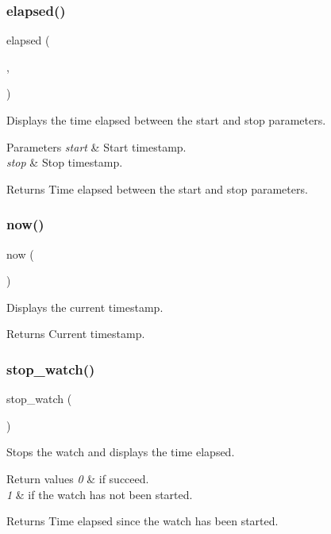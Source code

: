 \subsubsection{\texorpdfstring{elapsed()}{elapsed()}}
{\footnotesize\ttfamily elapsed (\begin{DoxyParamCaption}\item[{start}]{,  }\item[{stop}]{ }\end{DoxyParamCaption})}



Displays the time elapsed between the \textquotesingle{}start\textquotesingle{} and \textquotesingle{}stop\textquotesingle{} parameters. 


\begin{DoxyParams}{Parameters}
{\em start} & Start timestamp. \\
\hline
{\em stop} & Stop timestamp. \\
\hline
\end{DoxyParams}
\begin{DoxyReturn}{Returns}
Time elapsed between the \textquotesingle{}start\textquotesingle{} and \textquotesingle{}stop\textquotesingle{} parameters. 
\end{DoxyReturn}
\mbox{\label{group__time_ga80593ccdc0339775ddd5d82c37ca4f6b}} 
\subsubsection{\texorpdfstring{now()}{now()}}
{\footnotesize\ttfamily now (\begin{DoxyParamCaption}{ }\end{DoxyParamCaption})}



Displays the current timestamp. 

\begin{DoxyReturn}{Returns}
Current timestamp. 
\end{DoxyReturn}
\mbox{\label{group__time_gabdbb7601d766420b7be1703457c91aa7}} 
\subsubsection{\texorpdfstring{stop\+\_\+watch()}{stop\_watch()}}
{\footnotesize\ttfamily stop\+\_\+watch (\begin{DoxyParamCaption}{ }\end{DoxyParamCaption})}



Stops the watch and displays the time elapsed. 


\begin{DoxyRetVals}{Return values}
{\em 0} & if succeed. \\
\hline
{\em 1} & if the watch has not been started. \\
\hline
\end{DoxyRetVals}
\begin{DoxyReturn}{Returns}
Time elapsed since the watch has been started. 
\end{DoxyReturn}
